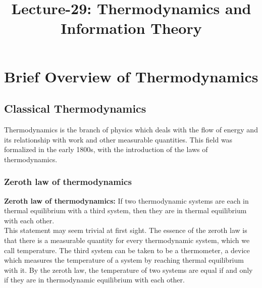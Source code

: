 \documentclass[letterpaper,10pt,english]{article}
\title{Lecture-29: Thermodynamics and Information Theory}
\author{}
\date{}
\begin{document}
\maketitle
\section{Brief Overview of Thermodynamics}
\subsection{Classical Thermodynamics}
Thermodynamics is the branch of physics which deals with the flow of energy and its relationship with work and other measurable quantities. This field was formalized in the early 1800s, with the introduction of the laws of thermodynamics.
\subsubsection{Zeroth law of thermodynamics}
\textbf{Zeroth law of thermodynamics:} If two thermodynamic systems are each in thermal equilibrium with a third system, then they are in thermal equilibrium with each other. \\
This statement may seem trivial at first sight. The essence of the zeroth law is that there is a measurable quantity for every thermodynamic system, which we call temperature. The third system can be taken to be a thermometer, a device which measures the temperature of a system by reaching thermal equilibrium with it. By the zeroth law, the temperature of two systems are equal if and only if they are in thermodynamic equilibrium with each other. 
\end{document}
